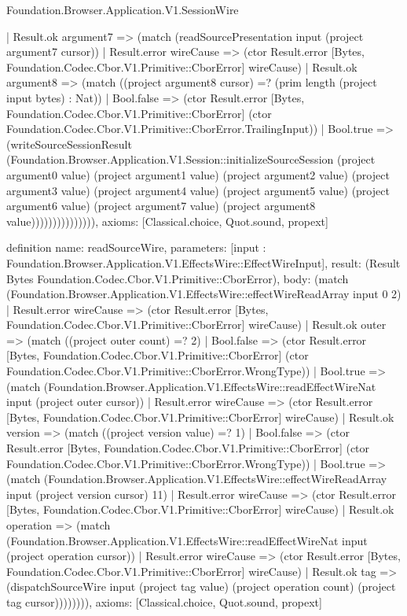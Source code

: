 \begin{lexlean}{Foundation.Browser.Application.V1.SessionWire}
\begin{semanticmodule}
{                      | Result.ok argument7 => (match (readSourcePresentation input (project argument7 cursor))
                        | Result.error wireCause => (ctor Result.error [Bytes, Foundation.Codec.Cbor.V1.Primitive::CborError] wireCause)
                        | Result.ok argument8 => (match ((project argument8 cursor) =? (prim length (project input bytes) : Nat))
                          | Bool.false => (ctor Result.error [Bytes, Foundation.Codec.Cbor.V1.Primitive::CborError] (ctor Foundation.Codec.Cbor.V1.Primitive::CborError.TrailingInput))
                          | Bool.true => (writeSourceSessionResult (Foundation.Browser.Application.V1.Session::initializeSourceSession (project argument0 value) (project argument1 value) (project argument2 value) (project argument3 value) (project argument4 value) (project argument5 value) (project argument6 value) (project argument7 value) (project argument8 value))))))))))))))),
  axioms: [Classical.choice, Quot.sound, propext]
}

definition{
  name: readSourceWire,
  parameters: [input : Foundation.Browser.Application.V1.EffectsWire::EffectWireInput],
  result: (Result Bytes Foundation.Codec.Cbor.V1.Primitive::CborError),
  body: (match (Foundation.Browser.Application.V1.EffectsWire::effectWireReadArray input 0 2)
    | Result.error wireCause => (ctor Result.error [Bytes, Foundation.Codec.Cbor.V1.Primitive::CborError] wireCause)
    | Result.ok outer => (match ((project outer count) =? 2)
      | Bool.false => (ctor Result.error [Bytes, Foundation.Codec.Cbor.V1.Primitive::CborError] (ctor Foundation.Codec.Cbor.V1.Primitive::CborError.WrongType))
      | Bool.true => (match (Foundation.Browser.Application.V1.EffectsWire::readEffectWireNat input (project outer cursor))
        | Result.error wireCause => (ctor Result.error [Bytes, Foundation.Codec.Cbor.V1.Primitive::CborError] wireCause)
        | Result.ok version => (match ((project version value) =? 1)
          | Bool.false => (ctor Result.error [Bytes, Foundation.Codec.Cbor.V1.Primitive::CborError] (ctor Foundation.Codec.Cbor.V1.Primitive::CborError.WrongType))
          | Bool.true => (match (Foundation.Browser.Application.V1.EffectsWire::effectWireReadArray input (project version cursor) 11)
            | Result.error wireCause => (ctor Result.error [Bytes, Foundation.Codec.Cbor.V1.Primitive::CborError] wireCause)
            | Result.ok operation => (match (Foundation.Browser.Application.V1.EffectsWire::readEffectWireNat input (project operation cursor))
              | Result.error wireCause => (ctor Result.error [Bytes, Foundation.Codec.Cbor.V1.Primitive::CborError] wireCause)
              | Result.ok tag => (dispatchSourceWire input (project tag value) (project operation count) (project tag cursor)))))))),
  axioms: [Classical.choice, Quot.sound, propext]
}


\end{semanticmodule}
\end{lexlean}
